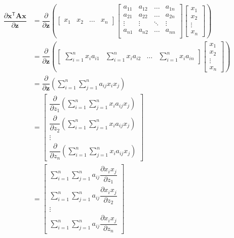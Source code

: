 \documentclass{article}
\newcommand{\trans}{\mathsf{T}}
\begin{document}
\begin{align}
    \dfrac{\partial \mathbf{x}^\trans \mathbf{A} \mathbf{x}}{\partial \mathbf{z}} &= \dfrac{\partial}{\partial \mathbf{z}} \left(
    \begin{bmatrix}
        x_{1} & x_{2} & \dots & x_{n}
    \end{bmatrix}
    \begin{bmatrix}
        a_{11} & a_{12} & \dots & a_{1n} \\
        a_{21} & a_{22} & \dots & a_{2n} \\
        \vdots & \vdots & \ddots & \vdots \\
        a_{n1} & a_{n2} & \dots & a_{nn} \\
    \end{bmatrix} \begin{bmatrix}
        x_{1} \\ x_{2} \\ \vdots \\ x_{n}
    \end{bmatrix} \right) \\
    &= \dfrac{\partial}{\partial \mathbf{z}} \left(
			\begin{bmatrix}
				\displaystyle \sum_{i = 1}^{n} x_{i}a_{i1} & 
				\displaystyle \sum_{i = 1}^{n} x_{i}a_{i2} & 
				\dots & 
				\displaystyle \sum_{i = 1}^{n} x_{i}a_{in}
			\end{bmatrix} \begin{bmatrix}
				x_{1} \\ x_{2} \\ \vdots \\ x_{n}
			\end{bmatrix} \right) \\
            &= \dfrac{\partial}{\partial \mathbf{z}} \left(
				\sum_{i = 1}^{n}\sum_{j = 1}^{n} a_{ij} x_{i} x_{j}
			\right) \\
    &= \begin{bmatrix}
        \displaystyle \dfrac{\partial}{\partial z_1} \left( \sum_{i = 1}^{n}\sum_{j = 1}^{n} x_{i} a_{ij} x_{j} \right) \\ 
        \displaystyle  \dfrac{\partial}{\partial z_2} \left( \sum_{i = 1}^{n}\sum_{j = 1}^{n} x_{i} a_{ij} x_{j} \right) \\ 
        \vdots \\ 
        \displaystyle \dfrac{\partial}{\partial z_n} \left( \sum_{i = 1}^{n}\sum_{j = 1}^{n} x_{i} a_{ij} x_{j} \right) 
    \end{bmatrix} \\
    &= \begin{bmatrix}
        \displaystyle \sum_{i = 1}^{n}\sum_{j = 1}^{n} a_{ij} \dfrac{\partial x_{i}x_{j}}{\partial z_1} \\ 
        \displaystyle \sum_{i = 1}^{n}\sum_{j = 1}^{n} a_{ij} \dfrac{\partial x_{i}x_{j}}{\partial z_2} \\ 
        \vdots \\ 
        \displaystyle \sum_{i = 1}^{n}\sum_{j = 1}^{n} a_{ij} \dfrac{\partial x_{i}x_{j}}{\partial z_n} 
    \end{bmatrix}
\end{align}
\end{document}
